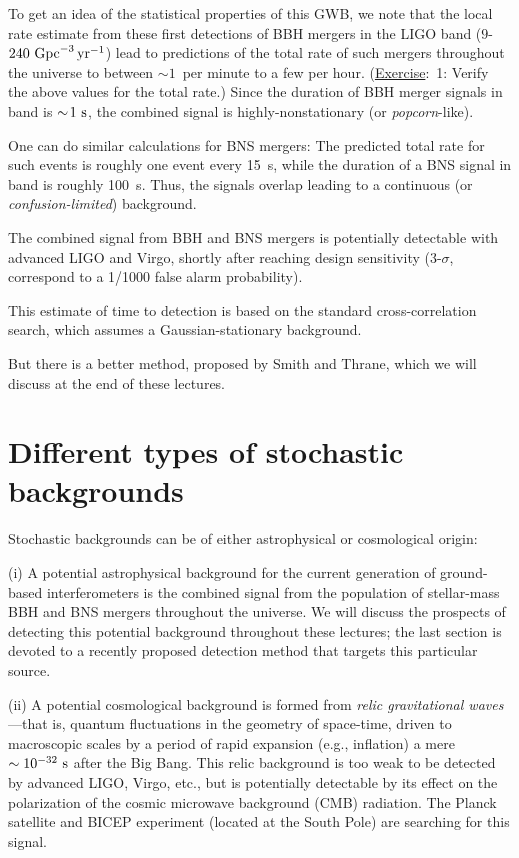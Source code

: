 \documentclass[11pt]{article}
\numberwithin{equation}{section}
\def\exer{\underline{Exercise}:\ }
\begin{document}
{To get an idea of the statistical properties of this
GWB, we note that the local rate estimate from these 
first detections of BBH mergers in the LIGO band 
($9$-$240~{\rm Gpc}^{-3}\,{\rm yr}^{-1}$) lead to 
predictions of the total rate of such mergers throughout 
the universe to between $\sim\!1$~per minute to a few
per hour.
(\exer 1: Verify the above values for the total rate.)
Since the duration of BBH merger signals in band 
is $\sim\!1~{\rm s}$, the combined signal is 
highly-nonstationary (or {\em popcorn}-like).

One can do similar calculations for BNS mergers:
The predicted total rate for such events is roughly 
one event every 15~{\rm s}, while the duration of 
a BNS signal in band is roughly 100~{\rm s}. 
Thus, the signals overlap leading to a continuous
(or {\em confusion-limited}) background.

The combined signal from BBH and BNS mergers is potentially
detectable with advanced LIGO and Virgo, shortly after 
reaching design sensitivity (3-$\sigma$, correspond to a 
1/1000 false alarm probability).

This estimate of time to detection is based on 
the standard cross-correlation search, which assumes a
Gaussian-stationary background.

But there is a 
better method, proposed by Smith and Thrane, which we will
discuss at the end of these lectures.

\section{Different types of stochastic backgrounds}

Stochastic backgrounds can be of either astrophysical 
or cosmological origin:

(i) A potential astrophysical background for the 
current generation of ground-based interferometers 
is the combined signal from the population of 
stellar-mass BBH and BNS mergers throughout the universe.
We will discuss the prospects of detecting this 
potential background throughout these lectures; the 
last section is devoted to a recently proposed 
detection method that targets this particular source.

(ii) A potential cosmological background is formed 
from {\em relic gravitational waves}---that is, 
quantum fluctuations in the geometry of space-time,
driven to macroscopic scales 
by a period of rapid expansion (e.g., inflation) 
a mere $\sim 10^{-32}~{\rm s}$ after the Big Bang.
This relic background is too weak to be detected by 
advanced LIGO, Virgo, etc.,
but is potentially detectable by its effect on the 
polarization of the cosmic microwave background (CMB)
radiation.
The Planck satellite and BICEP experiment (located
at the South Pole) are searching for this signal.

}
\end{document}
